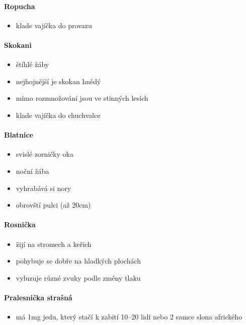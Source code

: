 \paragraph{Ropucha}
\begin{itemize}
\item klade vajíčka do provazu
\end{itemize}


\paragraph{Skokani}
\begin{itemize}
\item štíhlé žáby
\item nejhojnější je skokan hnědý
\item mimo rozmnožování jsou ve stinných lesích
\item klade vajíčka do chuchvalce
\end{itemize}

\paragraph{Blatnice}
\begin{itemize}
\item svislé zorničky oka
\item noční žába
\item vyhrabává si nory
\item obrovští pulci (až 20cm)
\end{itemize}

\paragraph{Rosnička}
\begin{itemize}
\item žijí na stromech a keřích
\item pohybuje se dobře na hladkých plochách
\item vyluzuje různé zvuky podle změny tlaku
\end{itemize}

\paragraph{Pralesnička strašná}
\begin{itemize}
\item má 1mg jedu, který stačí k zabití 10--20 lidí nebo 2 samce slona afrického
\end{itemize}

